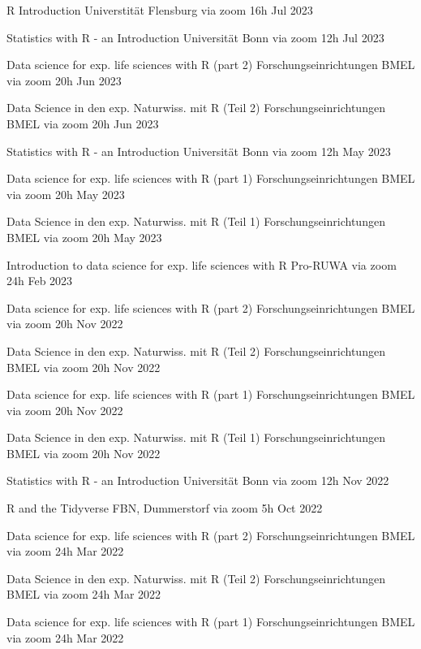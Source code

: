 \documentclass[11pt,a4paper,]{awesome-cv}
\begin{document}
\begin{cvhonors}
\cvhonor
{R Introduction  }
{Universtität Flensburg via zoom}
{16h}
{Jul 2023  }

\cvhonor
{Statistics with R - an Introduction  }
{Universität Bonn via zoom}
{12h}
{Jul 2023  }

\cvhonor
{Data science for exp. life sciences with R (part 2)  }
{Forschungseinrichtungen BMEL via zoom}
{20h}
{Jun 2023  }

\cvhonor
{Data Science in den exp. Naturwiss. mit R (Teil 2)  }
{Forschungseinrichtungen BMEL via zoom}
{20h}
{Jun 2023  }

\cvhonor
{Statistics with R - an Introduction  }
{Universität Bonn via zoom}
{12h}
{May 2023  }

\cvhonor
{Data science for exp. life sciences with R (part 1)  }
{Forschungseinrichtungen BMEL via zoom}
{20h}
{May 2023  }

\cvhonor
{Data Science in den exp. Naturwiss. mit R (Teil 1)  }
{Forschungseinrichtungen BMEL via zoom}
{20h}
{May 2023  }

\cvhonor
{Introduction to data science for exp. life sciences with R  }
{Pro-RUWA via zoom}
{24h}
{Feb 2023  }

\cvhonor
{Data science for exp. life sciences with R (part 2)  }
{Forschungseinrichtungen BMEL via zoom}
{20h}
{Nov 2022  }

\cvhonor
{Data Science in den exp. Naturwiss. mit R (Teil 2)  }
{Forschungseinrichtungen BMEL via zoom}
{20h}
{Nov 2022  }

\cvhonor
{Data science for exp. life sciences with R (part 1)  }
{Forschungseinrichtungen BMEL via zoom}
{20h}
{Nov 2022  }

\cvhonor
{Data Science in den exp. Naturwiss. mit R (Teil 1)  }
{Forschungseinrichtungen BMEL via zoom}
{20h}
{Nov 2022  }

\cvhonor
{Statistics with R - an Introduction  }
{Universität Bonn via zoom}
{12h}
{Nov 2022  }

\cvhonor
{R and the {Tidyverse}  }
{FBN, Dummerstorf via zoom}
{5h}
{Oct 2022  }

\cvhonor
{Data science for exp. life sciences with R (part 2)  }
{Forschungseinrichtungen BMEL via zoom}
{24h}
{Mar 2022  }

\cvhonor
{Data Science in den exp. Naturwiss. mit R (Teil 2)  }
{Forschungseinrichtungen BMEL via zoom}
{24h}
{Mar 2022  }

\cvhonor
{Data science for exp. life sciences with R (part 1)  }
{Forschungseinrichtungen BMEL via zoom}
{24h}
{Mar 2022  }


\end{cvhonors}
\end{document}
